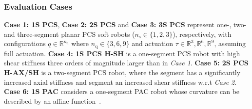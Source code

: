 



\subsubsection{Evaluation Cases}
\textbf{Case 1: 1S PCS}, \textbf{Case 2: 2S PCS} and \textbf{Case 3: 3S PCS} represent one-, two- and three-segment planar \gls{PCS} soft robots ($n_\mathrm{s} \in \{ 1, 2, 3 \}$), respectively, with configurations $q \in \mathbb{R}^{n_\mathrm{q}}$ where $n_\mathrm{q} \in \{3, 6, 9 \}$ and actuation  $\tau \in \mathbb{R}^3, \mathbb{R}^6, \mathbb{R}^9$, assuming full actuation.
\textbf{Case 4: 1S PCS H-SH} is a one-segment \gls{PCS} robot with high shear stiffness three orders of magnitude larger than in \emph{Case 1}.
\textbf{Case 5: 2S PCS H-AX/SH} is a two-segment \gls{PCS} robot, where the  segment has a significantly increased axial stiffness and  segment an increased shear stiffness w.r.t \emph{Case 2}.
\textbf{Case 6: 1S PAC} considers a one-segment \gls{PAC} robot whose curvature can be described by an affine function~\cite{stella2023piecewise}.


